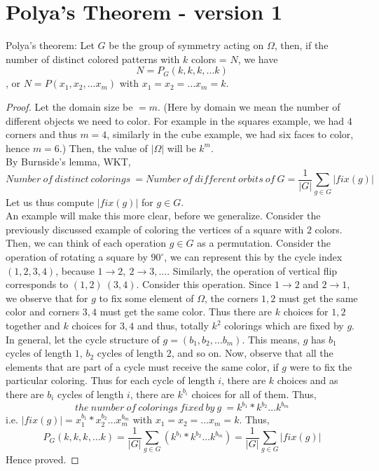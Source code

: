 {\section{Polya's Theorem - version 1}
\begin{theorem}
Polya's theorem: Let $G$ be the group of symmetry acting on $\Omega$, then, if the number of distinct colored patterns with $k$ colors = $N$, we have
$$N = P_G(k, k, k, \ldots k)$$,
or $N = P(x_1, x_2, \ldots x_m)$ with $x_1 = x_2 = \ldots x_m = k$.
\end{theorem}

\begin{proof}
Let the domain size be $= m$. (Here by domain we mean the number of different objects we need to color. For example in the squares example, we had $4$ corners and thus $m = 4$, similarly in the cube example, we had six faces to color, hence $m = 6$.) Then, the value of $|\Omega|$ will be $k^m$.
\\
By Burnside's lemma, WKT, 
$$Number\ of\ distinct\ colorings\ = Number\ of\ different\ orbits\ of\ G = \frac{1}{|G|} \sum_{g\in G}|fix(g)|$$
Let us thus compute $|fix(g)|$ for $g \in G$. 
\\
An example will make this more clear, before we generalize. Consider the previously discussed example of coloring the vertices of a square with $2$ colors. Then, we can think of each operation $g \in G$ as a permutation. Consider the operation of rotating a square by $90^{\circ}$, we can represent this by the cycle index $(1, 2, 3, 4)$, because $1 \rightarrow 2,\ 2 \rightarrow 3, \ldots$. Similarly, the operation of vertical flip corresponds to $(1, 2)\ (3, 4)$. Consider this operation. Since $1 \rightarrow 2$ and $2 \rightarrow 1$, we observe that for $g$ to fix some element of $\Omega$, the corners $1, 2$ must get the same color and corners $3, 4$ must get the same color. Thus there are $k$ choices for $1, 2$ together and $k$ choices for $3, 4$ and thus, totally $k^2$ colorings which are fixed by $g$.
\\
In general, let the cycle structure of $g = (b_1, b_2, \ldots b_m)$. This means, $g$ has $b_1$ cycles of length $1$, $b_2$ cycles of length $2$, and so on. Now, observe that all the elements that are part of a cycle must receive the same color, if $g$ were to fix the particular coloring. Thus for each cycle of length $i$, there are $k$ choices and as there are $b_i$ cycles of length $i$, there are $k^{b_i}$ choices for all of them. Thus, 
$$ the\ number\ of\ colorings\ fixed\ by\ g\ = k^{b_1} * k^{b_2} \ldots k^{b_m}$$
i.e. $|fix(g)| = x_1^{b_1} * x_2^{b_2} \ldots x_m^{b_m}$ with $x_1 = x_2 = \ldots x_m = k$.
Thus, 
$$P_G(k, k, k, \ldots k) = \frac{1}{|G|} \sum_{g\in G}(k^{b_1} * k^{b_2} \ldots k^{b_m}) = \frac{1}{|G|} \sum_{g\in G}|fix(g)|$$
Hence proved.
\end{proof}

}
